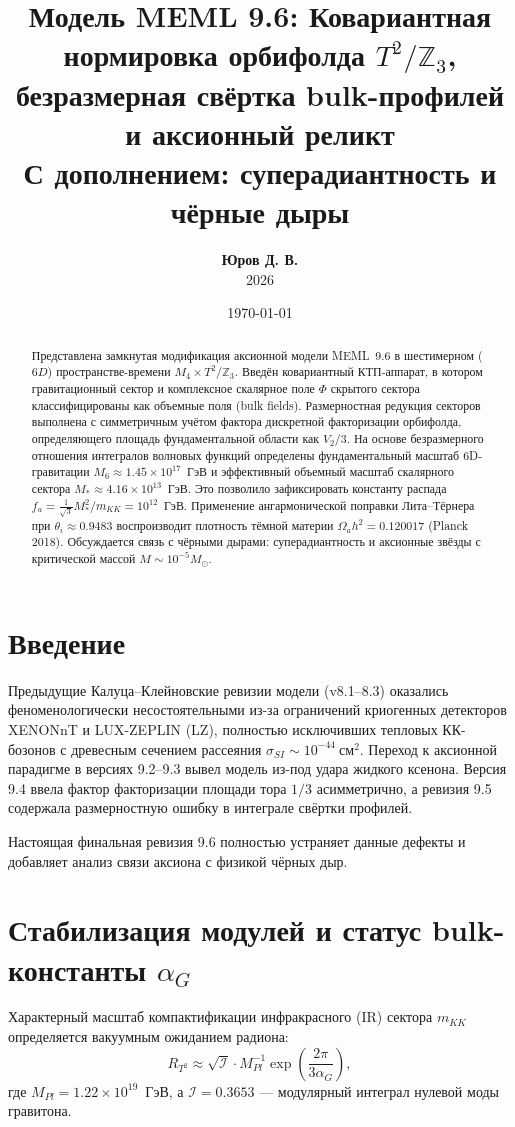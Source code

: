 \documentclass[12pt,a4paper]{article}
\title{\textbf{Модель MEML 9.6: Ковариантная нормировка орбифолда $T^2/\mathbb{Z}_3$,\\
безразмерная свёртка bulk-профилей и аксионный реликт}\\
\large С дополнением: суперадиантность и чёрные дыры}
\author{\textbf{Юров Д. В.}\\2026}
\date{\today}
\begin{document}
\maketitle

\begin{abstract}
Представлена замкнутая модификация аксионной модели MEML~9.6 в шестимерном ($6D$) пространстве-времени $M_4 \times T^2/\mathbb{Z}_3$. Введён ковариантный КТП-аппарат, в котором гравитационный сектор и комплексное скалярное поле $\Phi$ скрытого сектора классифицированы как объемные поля (bulk fields). Размерностная редукция секторов выполнена с симметричным учётом фактора дискретной факторизации орбифолда, определяющего площадь фундаментальной области как $V_2/3$. На основе безразмерного отношения интегралов волновых функций определены фундаментальный масштаб 6D-гравитации $M_6 \approx 1.45 \times 10^{17}$~ГэВ и эффективный объемный масштаб скалярного сектора $M_* \approx 4.16 \times 10^{13}$~ГэВ. Это позволило зафиксировать константу распада $f_a = \frac{1}{\sqrt{3}}M_*^2/m_{KK} = 10^{12}$~ГэВ. Применение ангармонической поправки Лита--Тёрнера при $\theta_i \approx 0.9483$ воспроизводит плотность тёмной материи $\Omega_a h^2 = 0.120017$ (Planck 2018). Обсуждается связь с чёрными дырами: суперадиантность и аксионные звёзды с критической массой $M \sim 10^{-5} M_\odot$.
\end{abstract}

\section{Введение}
Предыдущие Калуца--Клейновские ревизии модели (v8.1--8.3) оказались феноменологически несостоятельными из-за ограничений криогенных детекторов XENONnT и LUX-ZEPLIN (LZ), полностью исключивших тепловых КК-бозонов с древесным сечением рассеяния $\sigma_{SI} \sim 10^{-44} \ \text{см}^2$. Переход к аксионной парадигме в версиях 9.2--9.3 вывел модель из-под удара жидкого ксенона. Версия 9.4 ввела фактор факторизации площади тора $1/3$ асимметрично, а ревизия 9.5 содержала размерностную ошибку в интеграле свёртки профилей.

Настоящая финальная ревизия 9.6 полностью устраняет данные дефекты и добавляет анализ связи аксиона с физикой чёрных дыр.

\section{Стабилизация модулей и статус bulk-константы $\alpha_G$}
Характерный масштаб компактификации инфракрасного (IR) сектора $m_{KK}$ определяется вакуумным ожиданием радиона:
\begin{equation}
R_{T^2} \approx \sqrt{\mathcal{I}} \cdot M_{Pl}^{-1} \exp\left(\frac{2\pi}{3\alpha_G}\right),
\label{eq:radion}
\end{equation}
где $M_{Pl} = 1.22 \times 10^{19}$~ГэВ, а $\mathcal{I} = 0.3653$ --- модулярный интеграл нулевой моды гравитона.
\end{document}
